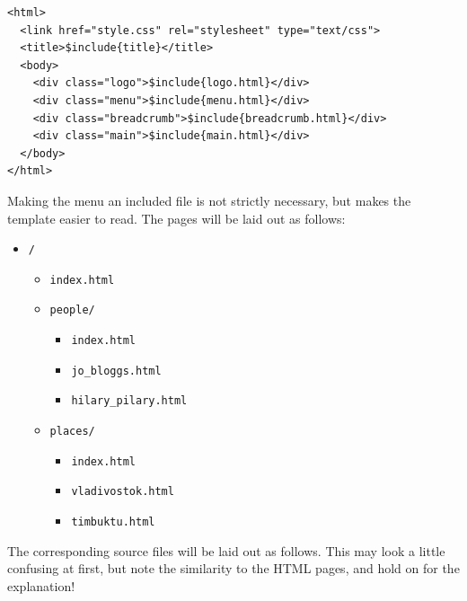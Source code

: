 \documentclass[a4paper,english]{scrartcl}
\begin{document}
\begin{verbatim}
<html>
  <link href="style.css" rel="stylesheet" type="text/css">
  <title>$include{title}</title>
  <body>
    <div class="logo">$include{logo.html}</div>
    <div class="menu">$include{menu.html}</div>
    <div class="breadcrumb">$include{breadcrumb.html}</div>
    <div class="main">$include{main.html}</div>
  </body>
</html>
\end{verbatim}

Making the menu an included file is not strictly necessary, but makes the template easier to read. The pages will be laid out as follows:

\begin{itemize}
\item \verb|/|
  \begin{itemize}
  \item \verb|index.html|
  \item \verb|people/|
    \begin{itemize}
    \item \verb|index.html|
    \item \verb|jo_bloggs.html|
    \item \verb|hilary_pilary.html|
    \end{itemize}
  \item \verb|places/|
    \begin{itemize}
    \item \verb|index.html|
    \item \verb|vladivostok.html|
    \item \verb|timbuktu.html|
    \end{itemize}
  \end{itemize}
\end{itemize}

The corresponding source files will be laid out as follows. This may look a little confusing at first, but note the similarity to the HTML pages, and hold on for the explanation!
\end{document}
